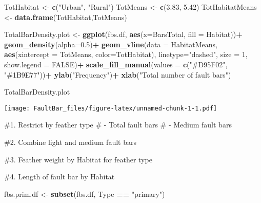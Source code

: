 \documentclass[
]{article}
\newenvironment{Shaded}{\begin{snugshade}}{\end{snugshade}}
\newcommand{\AttributeTok}[1]{\textcolor[rgb]{0.13,0.29,0.53}{#1}}
\newcommand{\ConstantTok}[1]{\textcolor[rgb]{0.56,0.35,0.01}{#1}}
\newcommand{\DecValTok}[1]{\textcolor[rgb]{0.00,0.00,0.81}{#1}}
\newcommand{\FloatTok}[1]{\textcolor[rgb]{0.00,0.00,0.81}{#1}}
\newcommand{\FunctionTok}[1]{\textcolor[rgb]{0.13,0.29,0.53}{\textbf{#1}}}
\newcommand{\NormalTok}[1]{#1}
\newcommand{\OtherTok}[1]{\textcolor[rgb]{0.56,0.35,0.01}{#1}}
\newcommand{\SpecialCharTok}[1]{\textcolor[rgb]{0.81,0.36,0.00}{\textbf{#1}}}
\newcommand{\StringTok}[1]{\textcolor[rgb]{0.31,0.60,0.02}{#1}}
\begin{document}
\begin{Shaded}
\begin{Highlighting}[]
\NormalTok{TotHabitat }\OtherTok{\textless{}{-}} \FunctionTok{c}\NormalTok{(}\StringTok{"Urban"}\NormalTok{, }\StringTok{"Rural"}\NormalTok{)}
\NormalTok{TotMeans }\OtherTok{\textless{}{-}} \FunctionTok{c}\NormalTok{(}\FloatTok{3.83}\NormalTok{, }\FloatTok{5.42}\NormalTok{)}
\NormalTok{TotHabitatMeans }\OtherTok{\textless{}{-}} \FunctionTok{data.frame}\NormalTok{(TotHabitat,TotMeans)}

\NormalTok{TotalBarDensity.plot }\OtherTok{\textless{}{-}} \FunctionTok{ggplot}\NormalTok{(fbs.df, }\FunctionTok{aes}\NormalTok{(}\AttributeTok{x=}\NormalTok{BarsTotal, }\AttributeTok{fill =}\NormalTok{ Habitat))}\SpecialCharTok{+}
  \FunctionTok{geom\_density}\NormalTok{(}\AttributeTok{alpha=}\FloatTok{0.5}\NormalTok{)}\SpecialCharTok{+}
  \FunctionTok{geom\_vline}\NormalTok{(}\AttributeTok{data =}\NormalTok{ HabitatMeans, }\FunctionTok{aes}\NormalTok{(}\AttributeTok{xintercept =}\NormalTok{ TotMeans, }\AttributeTok{color=}\NormalTok{TotHabitat),}
             \AttributeTok{linetype=}\StringTok{"dashed"}\NormalTok{,}
             \AttributeTok{size =} \DecValTok{1}\NormalTok{,}
             \AttributeTok{show.legend =} \ConstantTok{FALSE}\NormalTok{)}\SpecialCharTok{+}
  \FunctionTok{scale\_fill\_manual}\NormalTok{(}\AttributeTok{values =} \FunctionTok{c}\NormalTok{(}\StringTok{"\#D95F02"}\NormalTok{, }\StringTok{"\#1B9E77"}\NormalTok{))}\SpecialCharTok{+}
  \FunctionTok{ylab}\NormalTok{(}\StringTok{"Frequency"}\NormalTok{)}\SpecialCharTok{+}
  \FunctionTok{xlab}\NormalTok{(}\StringTok{"Total number of fault bars"}\NormalTok{)}

\NormalTok{TotalBarDensity.plot}
\end{Highlighting}
\end{Shaded}

\texttt{[image: FaultBar\_files/figure-latex/unnamed-chunk-1-1.pdf]}

\#1. Restrict by feather type \# - Total fault bars \# - Medium fault
bars

\#2. Combine light and medium fault bars

\#3. Feather weight by Habitat for feather type

\#4. Length of fault bar by Habitat

\begin{Shaded}
\begin{Highlighting}[]
\NormalTok{fbs.prim.df }\OtherTok{\textless{}{-}} \FunctionTok{subset}\NormalTok{(fbs.df, Type }\SpecialCharTok{==} \StringTok{"primary"}\NormalTok{)}
\end{Highlighting}
\end{Shaded}
\end{document}
